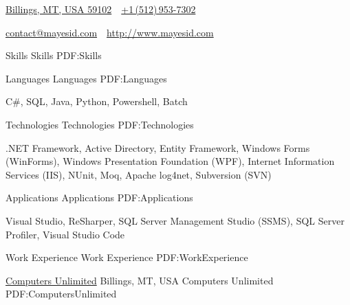 \documentclass[letterpaper,MMMyyyy,nonstopmode]{simpleresumecv}
\newcommand{\CVAuthor}{Isaac Mayes}
\newcommand{\CVWebpage}{http://www.mayesid.com}
\begin{document}

\Title{\CVAuthor}

\begin{SubTitle}
\href{https://www.google.com/maps/place/Billings,+MT/}
{Billings, MT, USA 59102}
\,\SubBulletSymbol\,
\href{tel:+15129537302}
{+1\,(512)\,953-7302}
\par
\href{mailto:contact@mayesid.com}
{contact@mayesid.com}
\,\SubBulletSymbol\,
\href{\CVWebpage}
{\url{\CVWebpage}}
\end{SubTitle}

\begin{Body}


\Section
{Skills}
{Skills}
{PDF:Skills}

\SubSection
{Languages}
{Languages}
{PDF:Languages}

\BulletItem
C\#, SQL, Java, Python, Powershell, Batch

\Gap

\SubSection
{Technologies}
{Technologies}
{PDF:Technologies}

\BulletItem
.NET Framework, Active Directory, Entity Framework, Windows Forms (WinForms), Windows Presentation Foundation (WPF), Internet Information Services (IIS), NUnit, Moq, Apache log4net, Subversion (SVN)

\Gap

\SubSection
{Applications}
{Applications}
{PDF:Applications}

\BulletItem
Visual Studio, ReSharper, SQL Server Management Studio (SSMS), SQL Server Profiler, Visual Studio Code


\Section
{Work \newline Experience}
{Work Experience}
{PDF:WorkExperience}

\SubSection
{\href{http://www.cu.net}
{Computers Unlimited}
\hfill Billings, MT, USA}
{Computers Unlimited}
{PDF:ComputersUnlimited}

\Gap


\end{Body}
\end{document}

